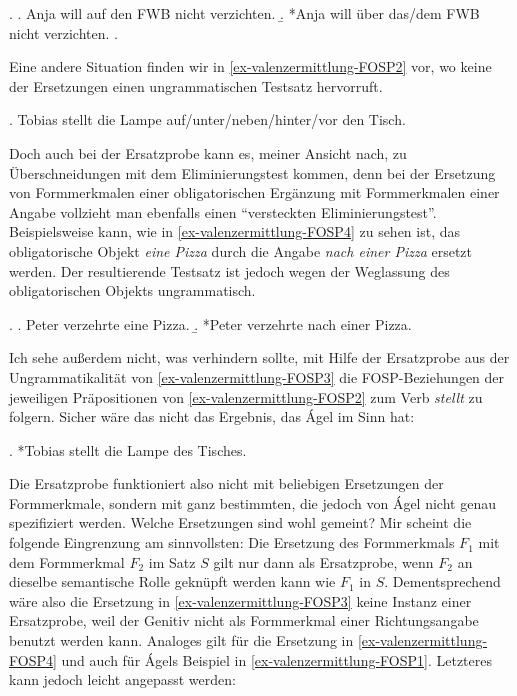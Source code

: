 \ex. \label{ex-valenzermittlung-FOSP1}
\a. Anja will auf den FWB nicht verzichten.
\b. *Anja will über das/dem FWB nicht verzichten.
\z. \citep[179]{Agel:00}

Eine andere Situation finden wir in \ref{ex-valenzermittlung-FOSP2} vor, wo keine der Ersetzungen einen ungrammatischen Testsatz hervorruft.

\ex. \label{ex-valenzermittlung-FOSP2} Tobias stellt die Lampe auf/unter/neben/hinter/vor den Tisch. \\ \citep[180]{Agel:00}

Doch auch bei der Ersatzprobe kann es, meiner Ansicht nach, zu Überschneidungen mit dem Eliminierungstest kommen, denn bei der Ersetzung von Formmerkmalen einer obligatorischen Ergänzung mit Formmerkmalen einer Angabe vollzieht man ebenfalls einen "`versteckten Eliminierungstest"'. Beispielsweise kann, wie in \ref{ex-valenzermittlung-FOSP4} zu sehen ist, das obligatorische Objekt {\it eine Pizza} durch die Angabe {\it nach einer Pizza} ersetzt werden. Der resultierende Testsatz ist jedoch wegen der Weglassung des obligatorischen Objekts ungrammatisch. 

\ex. \label{ex-valenzermittlung-FOSP4}
\a. Peter verzehrte eine Pizza.
\b. *Peter verzehrte nach einer Pizza. 

Ich sehe au\ss erdem nicht, was verhindern sollte, mit Hilfe der Ersatzprobe aus der Ungrammatikalität von \ref{ex-valenzermittlung-FOSP3} die FOSP-Beziehungen der jeweiligen Präpositionen von \ref{ex-valenzermittlung-FOSP2} zum Verb {\it stellt} zu folgern. Sicher wäre das nicht das Ergebnis, das \'Agel im Sinn hat: 

\ex. *Tobias stellt die Lampe des Tisches.\label{ex-valenzermittlung-FOSP3}

Die Ersatzprobe funktioniert also nicht mit beliebigen Ersetzungen der Formmerkmale, sondern mit ganz bestimmten, die jedoch von \'Agel nicht genau spezifiziert werden. Welche Ersetzungen sind wohl gemeint? Mir scheint die folgende Eingrenzung am sinnvollsten: Die Ersetzung des Formmerkmals $F_1$ mit dem Formmerkmal $F_2$ im Satz $S$ gilt nur dann als Ersatzprobe, wenn $F_2$ an dieselbe semantische Rolle geknüpft werden kann wie $F_1$ in $S$. Dementsprechend wäre also die Ersetzung in \ref{ex-valenzermittlung-FOSP3} keine Instanz einer Ersatzprobe, weil der Genitiv nicht als Formmerkmal einer Richtungsangabe benutzt werden kann. Analoges gilt für die Ersetzung in \ref{ex-valenzermittlung-FOSP4} und auch für \'Agels Beispiel in \ref{ex-valenzermittlung-FOSP1}. Letzteres kann jedoch leicht angepasst werden:\largerpage%

